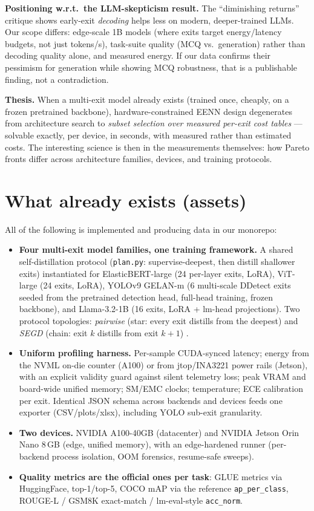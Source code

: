 \documentclass[11pt]{article}
\begin{document}
\noindent\textbf{Positioning w.r.t.\ the LLM-skepticism result.} The
``diminishing returns'' critique \citep{diminishing2026} shows early-exit
\emph{decoding} helps less on modern, deeper-trained LLMs. Our scope differs:
edge-scale 1B models (where exits target energy/latency budgets, not just
tokens/s), task-suite quality (MCQ vs.\ generation) rather than decoding
quality alone, and measured energy. If our data confirms their pessimism for
generation while showing MCQ robustness, that is a publishable finding, not a
contradiction.

\noindent\textbf{Thesis.} When a multi-exit model already exists (trained once,
cheaply, on a frozen pretrained backbone), hardware-constrained EENN design
degenerates from architecture search to \emph{subset selection over measured
per-exit cost tables} --- solvable exactly, per device, in seconds, with
measured rather than estimated costs. The interesting science is then in the
measurements themselves: how Pareto fronts differ across architecture families,
devices, and training protocols.

\section{What already exists (assets)}

All of the following is implemented and producing data in our monorepo:

\begin{itemize}
\item \textbf{Four multi-exit model families, one training framework.} A
shared self-distillation protocol (\texttt{plan.py}: supervise-deepest, then
distill shallower exits) instantiated for ElasticBERT-large (24 per-layer
exits, LoRA), ViT-large (24 exits, LoRA), YOLOv9 GELAN-m (6 multi-scale
DDetect exits seeded from the pretrained detection head, full-head training,
frozen backbone), and Llama-3.2-1B (16 exits, LoRA + lm-head projections).
Two protocol topologies: \emph{pairwise} (star: every exit distills from the
deepest) and \emph{SEGD} (chain: exit $k$ distills from exit $k{+}1$)
\citep{loraexit2024}.
\item \textbf{Uniform profiling harness.} Per-sample CUDA-synced latency;
energy from the NVML on-die counter (A100) or from jtop/INA3221 power rails
(Jetson), with an explicit validity guard against silent telemetry loss;
peak VRAM and board-wide unified memory; SM/EMC clocks; temperature; ECE
calibration per exit. Identical JSON schema across backends and devices feeds
one exporter (CSV/plots/xlsx), including YOLO sub-exit granularity.
\item \textbf{Two devices.} NVIDIA A100-40GB (datacenter) and NVIDIA Jetson
Orin Nano 8\,GB (edge, unified memory), with an edge-hardened runner
(per-backend process isolation, OOM forensics, resume-safe sweeps).
\item \textbf{Quality metrics are the official ones per task}: GLUE metrics
via HuggingFace, top-1/top-5, COCO mAP via the reference \texttt{ap\_per\_class},
ROUGE-L / GSM8K exact-match / lm-eval-style \texttt{acc\_norm}.
\end{itemize}
\end{document}
